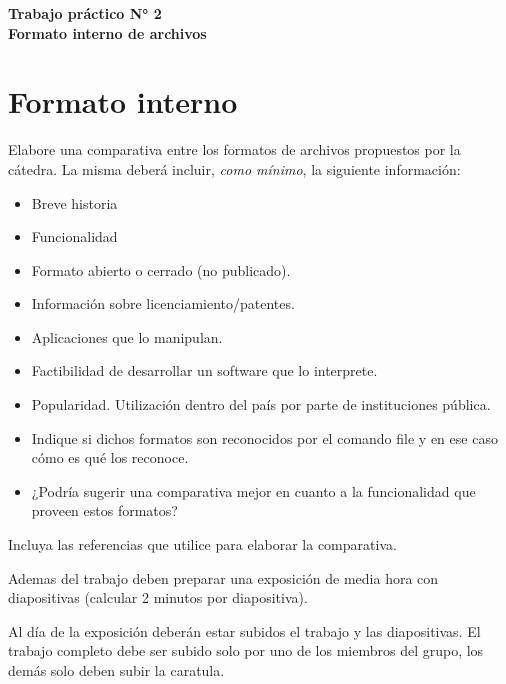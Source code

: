 \documentclass[12pt]{article}
\def\maketitle{

\makeatletter
{\color{bl} \centering \huge \sc \textbf{
Trabajo práctico N° 2\\
\large \vspace*{-8pt} \color{black} Formato interno de archivos
\vspace*{8pt} }\par}
\makeatother

\makeatletter


}
\begin{document}
\thispagestyle{empty}
\maketitle
\setlength{\parindent}{0pt}

\section*{Formato interno}

Elabore una comparativa entre los formatos de archivos propuestos por la
cátedra. La misma deberá incluir, {\it como mínimo}, la siguiente información:

\begin{itemize} 

    \item Breve historia

    \item Funcionalidad

    \item Formato abierto o cerrado (no publicado).

    \item Información sobre licenciamiento/patentes.

    \item Aplicaciones que lo manipulan. 

    \item Factibilidad de desarrollar un software que lo interprete. 

    \item Popularidad. Utilización dentro del país por parte de instituciones
    pública.  

    \item Indique si dichos formatos son reconocidos por el comando file y en
    ese caso cómo es qué los reconoce.   

    \item ¿Podría sugerir una comparativa mejor en cuanto a la funcionalidad
    que proveen estos formatos?

\end{itemize} 

Incluya las referencias que utilice para elaborar la comparativa. 

Ademas del trabajo deben preparar una exposición de media hora con
diapositivas (calcular 2 minutos por diapositiva).

Al día de la exposición deberán estar subidos el trabajo y las diapositivas.
El trabajo completo debe ser subido solo por uno de los miembros del grupo,
los demás solo deben subir la caratula.
\end{document}
